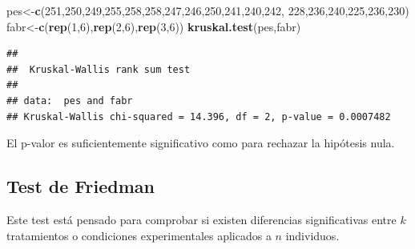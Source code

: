 \documentclass[
]{article}
\newenvironment{Shaded}{\begin{snugshade}}{\end{snugshade}}
\newcommand{\DecValTok}[1]{\textcolor[rgb]{0.00,0.00,0.81}{#1}}
\newcommand{\FunctionTok}[1]{\textcolor[rgb]{0.13,0.29,0.53}{\textbf{#1}}}
\newcommand{\NormalTok}[1]{#1}
\newcommand{\OtherTok}[1]{\textcolor[rgb]{0.56,0.35,0.01}{#1}}
\begin{document}
\begin{Shaded}
\begin{Highlighting}[]
\NormalTok{pes}\OtherTok{\textless{}{-}}\FunctionTok{c}\NormalTok{(}\DecValTok{251}\NormalTok{,}\DecValTok{250}\NormalTok{,}\DecValTok{249}\NormalTok{,}\DecValTok{255}\NormalTok{,}\DecValTok{258}\NormalTok{,}\DecValTok{258}\NormalTok{,}\DecValTok{247}\NormalTok{,}\DecValTok{246}\NormalTok{,}\DecValTok{250}\NormalTok{,}\DecValTok{241}\NormalTok{,}\DecValTok{240}\NormalTok{,}\DecValTok{242}\NormalTok{,}
\DecValTok{228}\NormalTok{,}\DecValTok{236}\NormalTok{,}\DecValTok{240}\NormalTok{,}\DecValTok{225}\NormalTok{,}\DecValTok{236}\NormalTok{,}\DecValTok{230}\NormalTok{)}
\NormalTok{fabr}\OtherTok{\textless{}{-}}\FunctionTok{c}\NormalTok{(}\FunctionTok{rep}\NormalTok{(}\DecValTok{1}\NormalTok{,}\DecValTok{6}\NormalTok{),}\FunctionTok{rep}\NormalTok{(}\DecValTok{2}\NormalTok{,}\DecValTok{6}\NormalTok{),}\FunctionTok{rep}\NormalTok{(}\DecValTok{3}\NormalTok{,}\DecValTok{6}\NormalTok{))}
\FunctionTok{kruskal.test}\NormalTok{(pes,fabr)}
\end{Highlighting}
\end{Shaded}

\begin{verbatim}
## 
##  Kruskal-Wallis rank sum test
## 
## data:  pes and fabr
## Kruskal-Wallis chi-squared = 14.396, df = 2, p-value = 0.0007482
\end{verbatim}

El p-valor es suficientemente significativo como para rechazar la hipótesis nula.

\subsection{Test de Friedman}\label{test-de-friedman}

Este test está pensado para comprobar si existen diferencias significativas entre \(k\) tratamientos o condiciones experimentales aplicados a \(n\) individuos.
\end{document}
